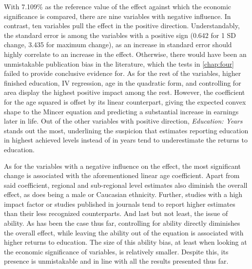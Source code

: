With 7.109\% as the reference value of the effect against which the economic significance is compared, there are nine variables with negative influence. In contrast, ten variables pull the effect in the positive direction. Understandably, the standard error is among the variables with a positive sign (0.642 for 1 SD change, 3.435 for maximum change), as an increase in standard error should highly correlate to an increase in the effect. Otherwise, there would have been an unmistakable publication bias in the literature, which the tests in \autoref{chap:four} failed to provide conclusive evidence for. As for the rest of the variables, higher finished education, \ac{IV} regression, age in the quadratic form, and controlling for area display the highest positive impact among the rest. However, the coefficient for the age squared is offset by its linear counterpart, giving the expected convex shape to the Mincer equation and predicting a substantial increase in earnings later in life. Out of the other variables with positive direction, \textit{Education: Years} stands out the most, underlining the suspicion that estimates reporting education in highest achieved levels instead of in years tend to underestimate the returns to education.

As for the variables with a negative influence on the effect, the most significant change is associated with the aforementioned linear age coefficient. Apart from said coefficient, regional and sub-regional level estimates also diminish the overall effect, as does being a male or Caucasian ethnicity. Further, studies with a high impact factor or studies published in journals tend to report higher estimates than their less recognized counterparts. And last but not least, the issue of ability. As has been the case thus far, controlling for ability directly diminishes the overall effect, while leaving the ability out of the equation is associated with higher returns to education. The size of this ability bias, at least when looking at the economic significance of variables, is relatively smaller. Despite this, its presence is unmistakable and in line with all the results presented thus far.